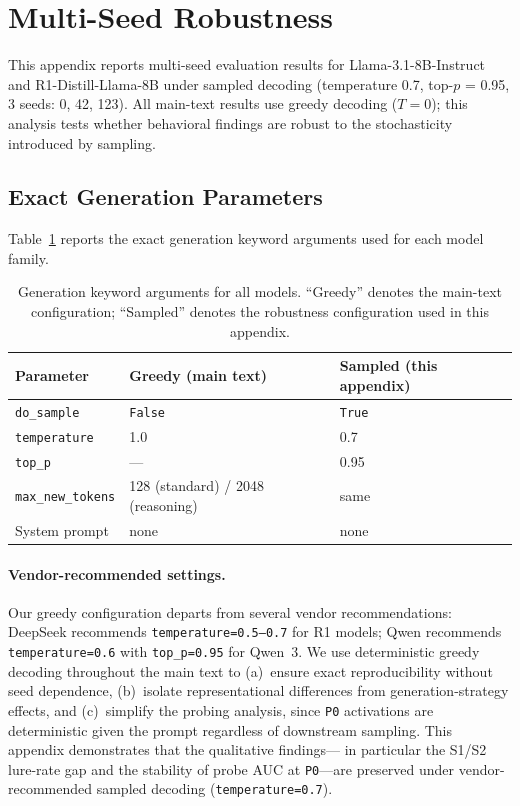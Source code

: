 \documentclass{article}
\newcommand{\pzero}{\texttt{P0}}
\begin{document}
\section{Multi-Seed Robustness}
\label{app:robustness}

This appendix reports multi-seed evaluation results for Llama-3.1-8B-Instruct
and R1-Distill-Llama-8B under sampled decoding (temperature 0.7,
top-$p$ = 0.95, 3 seeds: 0, 42, 123).  All main-text results use
greedy decoding ($T = 0$); this analysis tests whether behavioral
findings are robust to the stochasticity introduced by sampling.

\subsection{Exact Generation Parameters}

Table~\ref{tab:gen_kwargs} reports the exact generation keyword arguments
used for each model family.

\begin{table}[ht]
\centering
\caption{Generation keyword arguments for all models.  ``Greedy'' denotes
  the main-text configuration; ``Sampled'' denotes the robustness
  configuration used in this appendix.}
\label{tab:gen_kwargs}
\vspace{4pt}
\small
\begin{tabular}{lll}
\toprule
\textbf{Parameter} & \textbf{Greedy (main text)} & \textbf{Sampled (this appendix)} \\
\midrule
\texttt{do\_sample}       & \texttt{False} & \texttt{True} \\
\texttt{temperature}      & 1.0            & 0.7 \\
\texttt{top\_p}           & ---            & 0.95 \\
\texttt{max\_new\_tokens} & 128 (standard) / 2048 (reasoning) & same \\
System prompt             & none           & none \\
\bottomrule
\end{tabular}
\end{table}

\paragraph{Vendor-recommended settings.}
Our greedy configuration departs from several vendor recommendations:
DeepSeek recommends \texttt{temperature=0.5--0.7} for R1 models;
Qwen recommends \texttt{temperature=0.6} with \texttt{top\_p=0.95}
for Qwen~3.  We use deterministic greedy decoding throughout the main
text to (a)~ensure exact reproducibility without seed dependence,
(b)~isolate representational differences from generation-strategy
effects, and (c)~simplify the probing analysis, since \pzero{}
activations are deterministic given the prompt regardless of downstream
sampling.  This appendix demonstrates that the qualitative findings---
in particular the S1/S2 lure-rate gap and the stability of probe AUC
at \pzero{}---are preserved under vendor-recommended sampled decoding
(\texttt{temperature=0.7}).
\end{document}
